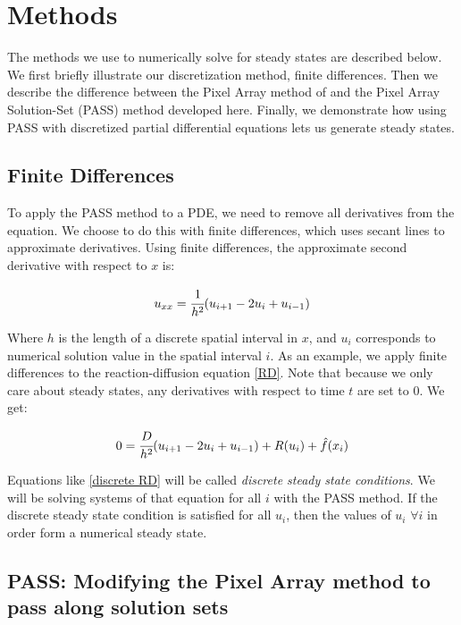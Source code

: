 \documentclass[11pt]{article}
\begin{document}
\section{Methods}\label{sec:methods}

The methods we use to numerically solve for steady states are described below. We first briefly illustrate our discretization method, finite differences. Then we describe the difference between the Pixel Array method of \citep{Introduction_to_PA} and the Pixel Array Solution-Set (PASS) method developed here. Finally, we demonstrate how using PASS with discretized partial differential equations lets us generate steady states.

\subsection{Finite Differences}

To apply the PASS method to a PDE, we need to remove all derivatives from the equation. We choose to do this with finite differences, which uses secant lines to approximate derivatives. Using finite differences, the approximate second derivative with respect to $x$ is:

\begin{equation}
    \label{FD second order}
    u_{xx} = \cfrac{1}{h^2} (u_{i+1} - 2u_i + u_{i-1})
\end{equation}

\noindent Where $h$ is the length of a discrete spatial interval in $x$, and $u_i$ corresponds to numerical solution value in the spatial interval $i$. As an example, we apply finite differences to the reaction-diffusion equation \eqref{RD}. Note that because we only care about steady states, any derivatives with respect to time $t$ are set to 0. We get:

\begin{equation}
    \label{discrete RD}
    0 = \cfrac{D}{h^2} (u_{i+1} - 2u_i + u_{i-1}) + R(u_i) + \hat{f}(x_i)
\end{equation}

Equations like \eqref{discrete RD} will be called \textit{discrete steady state conditions}. We will be solving systems of that equation for all $i$ with the PASS method. If the discrete steady state condition is satisfied for all $u_i$, then the values of $u_i$ $\forall i$ in order form a numerical steady state.

\subsection{PASS: Modifying the Pixel Array method to pass along solution sets}\label{sec:PASS}
\end{document}
